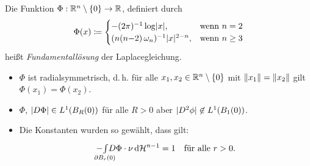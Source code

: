 \documentclass{cheat-sheet}
\newcommand{\HM}{\mathcal{H}} %
\begin{document}
\iffalse
  Konstruktion von rotationssymmetrischen harmonischen Funktionen, d.\,h.
  \[ \Delta u = 0 \]
  mit $u(x) = v(r)$ mit $v : \R \to \R$ und $r = \norm{x} = (x_1^2 + ... + x_n^2)^{1/2}$.
  Beachte (für $i \in \{ 1, ..., n \}, x \not= 0$):
  \begin{itemize}
    \item $D_i r = \frac{x_i}{(x_1^2 + ... + x_n^2)^{1/2}}$, also $\abs{Dr}^2 = \sum_{i=1}^n (D_i r)^2 = 1$
    \item $D_i D_i r = D_i (D_i r) = \frac{1}{r} - \frac{x_i x_i}{r^3}$
    \item $\Delta r = \sum_{i=1}^n (\frac{1}{r} - \frac{x_i^2}{r^3}) = \frac{n-1}{r}$
    \item $\Delta u = \sum_{i=1}^n D_i (v^i(r) D_i r) = v''(r) \sum_{i=1}^n (D_i r)^2 + v'(r) \sum_{i=1}^n D_i D_i r = v''(r) + \frac{n-1}{r} v'(r) = 0$
  \end{itemize}

  Für $v' \not= 0$ kann man diese ODE explizit lösen

  \[ (\log \abs{v'(r)})' = \frac{v''(r)}{v'(r)} = \frac{1-n}{r} = (1-n)(\log r)' = (\log r^{1-n})' \]

  Also (Integrieren, Exponentialfunktion anwenden): $v'(r) = c r^{1-n}$ für $c \in \R$.
  Somit $v(r) = c_1 \cdot \log r + c_2$, wenn $n = 2$
  Somit $v(r) = c_1 \cdot r^{2-n} + c_2$, wenn $n \geq 3$
\fi

\begin{defn}
  Die Funktion $\Phi : \mathbb{R}^n \setminus \{ 0 \} \to \mathbb{R}$, definiert durch
  \[
    \Phi(x) \coloneqq \begin{cases}
      - (2\pi)^{-1} \log \lvert x\rvert, & \text{wenn $n = 2$}\\
      (n (n{-}2) \, \omega_n)^{-1} \lvert x\rvert^{2-n}, & \text{wenn $n \geq 3$}
    \end{cases}
  \]
  heißt \emph{Fundamentallösung} der Laplacegleichung.
\end{defn}

\begin{bem}
  \begin{itemize}
    \item $\Phi$ ist radialsymmetrisch, d.\,h. für alle $x_1, x_2 \in \mathbb{R}^n \setminus \{ 0 \}$ mit $\lVert x_1\rVert = \lVert x_2\rVert$ gilt $\Phi(x_1) = \Phi(x_2)$.
    \item $\Phi$, $\lvert D\Phi\rvert \in L^1(B_R(0))$ für alle $R > 0$ aber $\lvert D^2 \phi\rvert \not\in L^1(B_1(0))$.
    \item Die Konstanten wurden so gewählt, dass gilt:
    \[ - \Int{\mathclap{\partial B_r(0)}}{}{D \Phi \cdot \nu}{\HM^{n-1}} = 1 \quad \text{für alle $r > 0$}. \]
  \end{itemize}
\end{bem}
\end{document}
